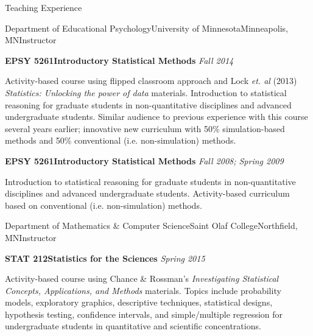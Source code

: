 \documentclass{resume} %
\begin{document}
\begin{rSection}{Teaching Experience}

	\begin{rSubsection}{Department of Educational Psychology\textemdash University of Minnesota}{Minneapolis, MN}{Instructor}{}
		\item[] \textbf{EPSY 5261\textemdash Introductory Statistical Methods} \hfill \textit{Fall 2014}
		\item[] Activity-based course using flipped classroom approach and Lock \textit{et. al} (2013) \textit{Statistics: Unlocking the power of data} materials. Introduction to statistical reasoning for graduate students in non-quantitative disciplines and advanced undergraduate students.  Similar audience to previous experience with this course several years earlier; innovative new curriculum with 50\% simulation-based methods and 50\% conventional (i.e. non-simulation) methods. \vspace{0.5em}
		\item[] \textbf{EPSY 5261\textemdash Introductory Statistical Methods} \hfill \textit{Fall 2008; Spring 2009}
		\item[] Introduction to statistical reasoning for graduate students in non-quantitative disciplines and advanced undergraduate students.  Activity-based curriculum based on conventional (i.e. non-simulation) methods. 
		
	\end{rSubsection}

	
	\begin{rSubsection}{Department of Mathematics \& Computer Science\textemdash Saint Olaf College}{Northfield, MN}{Instructor}{}
		\item[] \textbf{STAT 212\textemdash Statistics for the Sciences} \hfill \textit{Spring 2015}
		\item[] Activity-based course using Chance \& Rossman's \textit{Investigating Statistical Concepts, Applications, and Methods} materials. Topics include probability models, exploratory graphics, descriptive techniques, statistical designs, hypothesis testing, confidence intervals, and simple/multiple regression for undergraduate students in quantitative and scientific concentrations.
	\end{rSubsection}
	
	

\end{rSection}
\end{document}
